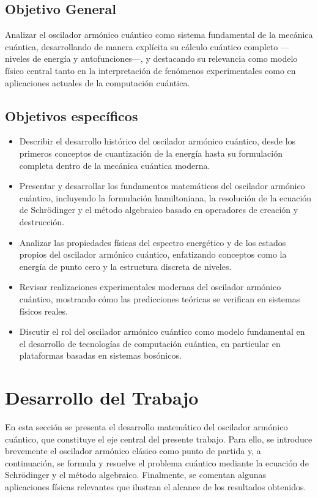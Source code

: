 \documentclass[11pt,a4paper,spanish]{book}
\begin{document}
\section{Objetivo General}
Analizar el oscilador armónico cuántico como sistema fundamental de la mecánica cuántica, desarrollando de manera explícita su cálculo cuántico completo —niveles de energía y autofunciones—, y destacando su relevancia como modelo físico central tanto en la interpretación de fenómenos experimentales como en aplicaciones actuales de la computación cuántica.

\section{Objetivos específicos}
\begin{itemize}
	\item Describir el desarrollo histórico del oscilador armónico cuántico, desde los primeros conceptos de cuantización de la energía hasta su formulación completa dentro de la mecánica cuántica moderna.
	
	\item Presentar y desarrollar los fundamentos matemáticos del oscilador armónico cuántico, incluyendo la formulación hamiltoniana, la resolución de la ecuación de Schrödinger y el método algebraico basado en operadores de creación y destrucción.
	
	\item Analizar las propiedades físicas del espectro energético y de los estados propios del oscilador armónico cuántico, enfatizando conceptos como la energía de punto cero y la estructura discreta de niveles.
	
	\item Revisar realizaciones experimentales modernas del oscilador armónico cuántico, mostrando cómo las predicciones teóricas se verifican en sistemas físicos reales.
	
	\item Discutir el rol del oscilador armónico cuántico como modelo fundamental en el desarrollo de tecnologías de computación cuántica, en particular en plataformas basadas en sistemas bosónicos.
\end{itemize}


\chapter{Desarrollo del Trabajo}

En esta sección se presenta el desarrollo matemático del oscilador armónico cuántico, que constituye el eje central del presente trabajo. 
Para ello, se introduce brevemente el oscilador armónico clásico como punto de partida y, a continuación, se formula y resuelve el problema cuántico mediante la ecuación de Schrödinger y el método algebraico. 
Finalmente, se comentan algunas aplicaciones físicas relevantes que ilustran el alcance de los resultados obtenidos.
\end{document}
